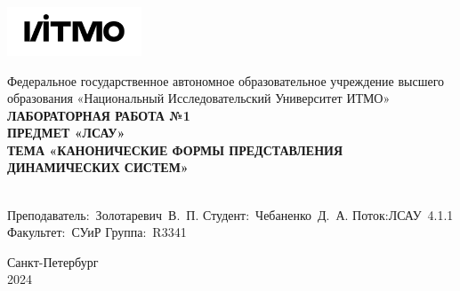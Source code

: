 \documentclass[a4paper, 12pt]{article}
\begin{document}
    \begin{titlepage}
        \begin{center}
            \includegraphics[width=0.3\textwidth]{itmo.png}
        \vfill

        Федеральное государственное автономное образовательное учреждение высшего образования
        «Национальный Исследовательский Университет ИТМО»\\

        \vfill
        {\large\bf ЛАБОРАТОРНАЯ РАБОТА №1}\\
        {\large\bf ПРЕДМЕТ «ЛСАУ»}\\
        {\large\bf ТЕМА «КАНОНИЧЕСКИЕ ФОРМЫ ПРЕДСТАВЛЕНИЯ
        ДИНАМИЧЕСКИХ СИСТЕМ»}\\
        {\large{}}\\
        \vfill

        \begin{flushright}
            \begin{minipage}{.45\textwidth}
            {
                \hbox{Преподаватель: Золотаревич В. П.}
                \hbox{Студент: Чебаненко Д. А.}
                \hbox{Поток:ЛСАУ 4.1.1}
                \hbox{}
                \hbox{Факультет: СУиР}
                \hbox{Группа: R3341}
            }
            \end{minipage}
        \end{flushright}

        \vfill

        Санкт-Петербург\\
        2024
        \end{center}
    \end{titlepage}

    \tableofcontents

    \newpage
\end{document}
